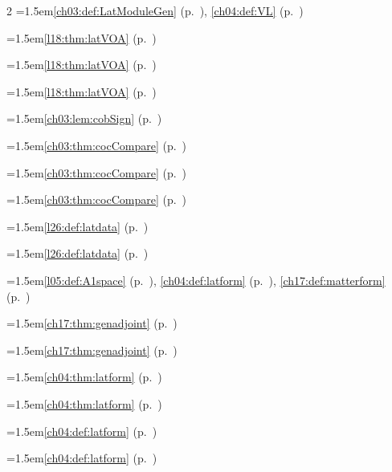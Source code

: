\begin{multicols}{2}
\hangindent=1.5em\quad \ref{ch03:def:LatModuleGen} (p.~\pageref{ch03:def:LatModuleGen}), \ref{ch04:def:VL} (p.~\pageref{ch04:def:VL})\par
\hangindent=1.5em\quad \ref{l18:thm:latVOA} (p.~\pageref{l18:thm:latVOA})\par
\hangindent=1.5em\quad \ref{l18:thm:latVOA} (p.~\pageref{l18:thm:latVOA})\par
\hangindent=1.5em\quad \ref{l18:thm:latVOA} (p.~\pageref{l18:thm:latVOA})\par
\hangindent=1.5em\quad \ref{ch03:lem:cobSign} (p.~\pageref{ch03:lem:cobSign})\par
\hangindent=1.5em\quad \ref{ch03:thm:cocCompare} (p.~\pageref{ch03:thm:cocCompare})\par
\hangindent=1.5em\quad \ref{ch03:thm:cocCompare} (p.~\pageref{ch03:thm:cocCompare})\par
\hangindent=1.5em\quad \ref{ch03:thm:cocCompare} (p.~\pageref{ch03:thm:cocCompare})\par
\hangindent=1.5em\quad \ref{l26:def:latdata} (p.~\pageref{l26:def:latdata})\par
\hangindent=1.5em\quad \ref{l26:def:latdata} (p.~\pageref{l26:def:latdata})\par
\hangindent=1.5em\quad \ref{l05:def:A1space} (p.~\pageref{l05:def:A1space}), \ref{ch04:def:latform} (p.~\pageref{ch04:def:latform}), \ref{ch17:def:matterform} (p.~\pageref{ch17:def:matterform})\par
\hangindent=1.5em\quad \ref{ch17:thm:genadjoint} (p.~\pageref{ch17:thm:genadjoint})\par
\hangindent=1.5em\quad \ref{ch17:thm:genadjoint} (p.~\pageref{ch17:thm:genadjoint})\par
\hangindent=1.5em\quad \ref{ch04:thm:latform} (p.~\pageref{ch04:thm:latform})\par
\hangindent=1.5em\quad \ref{ch04:thm:latform} (p.~\pageref{ch04:thm:latform})\par
\hangindent=1.5em\quad \ref{ch04:def:latform} (p.~\pageref{ch04:def:latform})\par
\hangindent=1.5em\quad \ref{ch04:def:latform} (p.~\pageref{ch04:def:latform})\par

\end{multicols}
